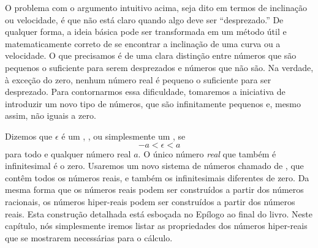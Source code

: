 \documentclass{svmono}
\begin{document}
O problema com o argumento intuitivo acima, seja dito em termos de
inclinação ou velocidade, é que não está claro quando algo deve ser
``desprezado.'' De qualquer forma, a ideia básica pode ser transformada
em um método útil e matematicamente correto de se encontrar a
inclinação de uma curva ou a velocidade. O que precisamos é de uma
clara distinção entre números que são pequenos o suficiente para serem
desprezados e números que não são. Na verdade, à exceção do zero, nenhum
número real é pequeno o suficiente para ser desprezado. Para contornarmos
essa dificuldade, tomaremos a iniciativa de introduzir um novo tipo de
números, que são infinitamente pequenos e, mesmo assim, não iguais a zero.

Dizemos que $\epsilon$ é um , ,
ou simplesmente um , se
\[
  -a < \epsilon < a
\]
para todo e qualquer número real $a$. O único número \emph{real} que
também é infinitesimal é o zero. Usaremos um novo sistema de números
chamado de , que contêm todos os números
reais, e também os infinitesimais diferentes de zero. Da mesma forma
que os números reais podem ser construídos a partir dos números
racionais, os números hiper-reais podem ser construídos a partir dos
números reais. Esta construção detalhada está esboçada no Epílogo ao
final do livro. Neste capítulo, nós simplesmente iremos listar as
propriedades dos números hiper-reais que se mostrarem necessárias para
o cálculo.
\end{document}

